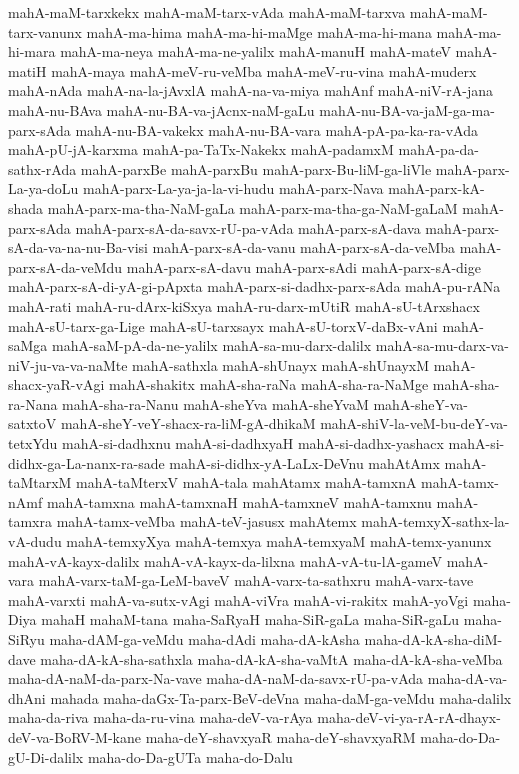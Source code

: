 {mahA-maM-tarxkekx
mahA-maM-tarx-vAda
mahA-maM-tarxva
mahA-maM-tarx-vanunx
mahA-ma-hima
mahA-ma-hi-maMge
mahA-ma-hi-mana
mahA-ma-hi-mara
mahA-ma-neya
mahA-ma-ne-yalilx
mahA-manuH
mahA-mateV
mahA-matiH
mahA-maya
mahA-meV-ru-veMba
mahA-meV-ru-vina
mahA-muderx
mahA-nAda
mahA-na-la-jAvxlA
mahA-na-va-miya
mahAnf
mahA-niV-rA-jana
mahA-nu-BAva
mahA-nu-BA-va-jAcnx-naM-gaLu
mahA-nu-BA-va-jaM-ga-ma-parx-sAda
mahA-nu-BA-vakekx
mahA-nu-BA-vara
mahA-pA-pa-ka-ra-vAda
mahA-pU-jA-karxma
mahA-pa-TaTx-Nakekx
mahA-padamxM
mahA-pa-da-sathx-rAda
mahA-parxBe
mahA-parxBu
mahA-parx-Bu-liM-ga-liVle
mahA-parx-La-ya-doLu
mahA-parx-La-ya-ja-la-vi-hudu
mahA-parx-Nava
mahA-parx-kA-shada
mahA-parx-ma-tha-NaM-gaLa
mahA-parx-ma-tha-ga-NaM-gaLaM
mahA-parx-sAda
mahA-parx-sA-da-savx-rU-pa-vAda
mahA-parx-sA-dava
mahA-parx-sA-da-va-na-nu-Ba-visi
mahA-parx-sA-da-vanu
mahA-parx-sA-da-veMba
mahA-parx-sA-da-veMdu
mahA-parx-sA-davu
mahA-parx-sAdi
mahA-parx-sA-dige
mahA-parx-sA-di-yA-gi-pApxta
mahA-parx-si-dadhx-parx-sAda
mahA-pu-rANa
mahA-rati
mahA-ru-dArx-kiSxya
mahA-ru-darx-mUtiR
mahA-sU-tArxshacx
mahA-sU-tarx-ga-Lige
mahA-sU-tarxsayx
mahA-sU-torxV-daBx-vAni
mahA-saMga
mahA-saM-pA-da-ne-yalilx
mahA-sa-mu-darx-dalilx
mahA-sa-mu-darx-va-niV-ju-va-va-naMte
mahA-sathxla
mahA-shUnayx
mahA-shUnayxM
mahA-shacx-yaR-vAgi
mahA-shakitx
mahA-sha-raNa
mahA-sha-ra-NaMge
mahA-sha-ra-Nana
mahA-sha-ra-Nanu
mahA-sheYva
mahA-sheYvaM
mahA-sheY-va-satxtoV
mahA-sheY-veY-shacx-ra-liM-gA-dhikaM
mahA-shiV-la-veM-bu-deY-va-tetxYdu
mahA-si-dadhxnu
mahA-si-dadhxyaH
mahA-si-dadhx-yashacx
mahA-si-didhx-ga-La-nanx-ra-sade
mahA-si-didhx-yA-LaLx-DeVnu
mahAtAmx
mahA-taMtarxM
mahA-taMterxV
mahA-tala
mahAtamx
mahA-tamxnA
mahA-tamx-nAmf
mahA-tamxna
mahA-tamxnaH
mahA-tamxneV
mahA-tamxnu
mahA-tamxra
mahA-tamx-veMba
mahA-teV-jasusx
mahAtemx
mahA-temxyX-sathx-la-vA-dudu
mahA-temxyXya
mahA-temxya
mahA-temxyaM
mahA-temx-yanunx
mahA-vA-kayx-dalilx
mahA-vA-kayx-da-lilxna
mahA-vA-tu-lA-gameV
mahA-vara
mahA-varx-taM-ga-LeM-baveV
mahA-varx-ta-sathxru
mahA-varx-tave
mahA-varxti
mahA-va-sutx-vAgi
mahA-viVra
mahA-vi-rakitx
mahA-yoVgi
maha-Diya
mahaH
mahaM-tana
maha-SaRyaH
maha-SiR-gaLa
maha-SiR-gaLu
maha-SiRyu
maha-dAM-ga-veMdu
maha-dAdi
maha-dA-kAsha
maha-dA-kA-sha-diM-dave
maha-dA-kA-sha-sathxla
maha-dA-kA-sha-vaMtA
maha-dA-kA-sha-veMba
maha-dA-naM-da-parx-Na-vave
maha-dA-naM-da-savx-rU-pa-vAda
maha-dA-va-dhAni
mahada
maha-daGx-Ta-parx-BeV-deVna
maha-daM-ga-veMdu
maha-dalilx
maha-da-riva
maha-da-ru-vina
maha-deV-va-rAya
maha-deV-vi-ya-rA-rA-dhayx-deV-va-BoRV-M-kane
maha-deY-shavxyaR
maha-deY-shavxyaRM
maha-do-Da-gU-Di-dalilx
maha-do-Da-gUTa
maha-do-Dalu
}
